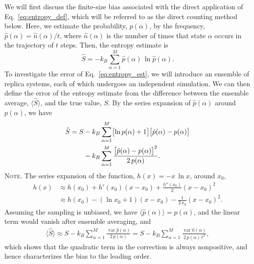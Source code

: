 \documentclass[reprint, superscriptaddress]{revtex4-1}
\newcommand{\note}[1]{{\color{DarkGreen}\footnotesize \textsc{Note.} #1}}
\begin{document}
We will first discuss the finite-size bias associated with
the direct application of Eq.~\eqref{eq:entropy_def},
which will be referred to as the direct counting method below.
%
Here, we estimate the probability, $p(\alpha)$,
by the frequency, $\hat{p}(\alpha) = \hat{n}(\alpha) / t$,
where $\hat{n}(\alpha)$ is the number of times that state $\alpha$ occurs in the trajectory of $t$ steps.
%
Then, the entropy estimate is
%
\begin{equation}
  \hat S
  =
  -k_B \sum_{\alpha = 1}^M \hat{p}(\alpha) \, \ln \hat{p}(\alpha)
  .
  \label{eq:entropy_est}
\end{equation}
%
To investigate the error of Eq.~\eqref{eq:entropy_est},
we will introduce an ensemble of replica systems,
each of which undergoes an independent simulation.
%
We can then define the error of the entropy estimate
from the difference
between the ensemble average,
$\bigl\langle \hat S \bigr\rangle$,
and the true value, $S$.
%
By the series expansion of $\hat{p}(\alpha)$ around $p(\alpha)$, we have
%
\begin{align}
  \hat S
  =
  S
  &- k_B \sum_{\alpha = 1}^M
    \bigl[\ln p(\alpha) + 1 \bigr]
    \bigl[ \hat{p}(\alpha) - p(\alpha) \bigr]
  \notag\\
  &- k_B \sum_{\alpha = 1}^M
    \frac{ \bigl[ \hat{p}(\alpha) - p(\alpha) \bigr]^2 } { 2 \, p(\alpha) }
  .
  \label{eq:Shat_series}
\end{align}
%
\note{The series expansion of the function, $h(x) = -x \, \ln x$,
around $x_0$,
%
\begin{align*}
  h(x)
  &\approx h(x_0) + h'(x_0) (x - x_0) + \frac{h''(x_0)}{2} (x - x_0)^2 \\
  &\approx h(x_0) - (\ln x_0 + 1) ( x - x_0) - \frac{1}{2 \, x_0} (x - x_0)^2
  .
\end{align*}
}
%
Assuming the sampling is unbiased,
we have $\langle \hat{p}(\alpha) \rangle = p(\alpha)$,
and the linear term would vanish
after ensemble averaging, and
%
\begin{align}
  \bigl\langle \hat S \bigr\rangle
  \approx
  S - k_B \sum_{\alpha = 1}^M
    \frac{ \operatorname{var} \hat{p}(\alpha) } { 2 \, p(\alpha) }
  =
  S - k_B \sum_{\alpha = 1}^M
    \frac{ \operatorname{var} \hat{n}(\alpha) } { 2 \, p(\alpha) \, t^2 }
  ,
  \label{eq:entest_2nd}
\end{align}
%
which shows that the quadratic term in the correction
is always nonpositive, and hence characterizes
the bias to the leading order.
\end{document}
